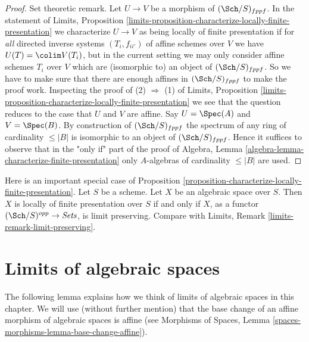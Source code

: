 \begin{proof}
\medskip\noindent
Set theoretic remark. Let $U \to V$ be a morphism of
$(\Sch/S)_{fppf}$. In the statement of
Limits, Proposition
\ref{limits-proposition-characterize-locally-finite-presentation}
we characterize $U \to V$ as being locally of finite presentation
if for {\it all} directed inverse systems $(T_i, f_{ii'})$ of affine schemes
over $V$ we have $U(T) = \colim V(T_i)$, but in the current setting
we may only consider affine schemes $T_i$ over $V$ which are (isomorphic to)
an object of $(\Sch/S)_{fppf}$. So we have to make sure that there
are enough affines in $(\Sch/S)_{fppf}$ to make the proof work.
Inspecting the proof of (2) $\Rightarrow$ (1) of
Limits, Proposition
\ref{limits-proposition-characterize-locally-finite-presentation}
we see that the question reduces to the case that $U$ and $V$ are affine.
Say $U = \Spec(A)$ and $V = \Spec(B)$. By construction
of $(\Sch/S)_{fppf}$ the spectrum of any ring of cardinality
$\leq |B|$ is isomorphic to an object of $(\Sch/S)_{fppf}$.
Hence it suffices to observe that in the "only if" part of the proof of
Algebra, Lemma \ref{algebra-lemma-characterize-finite-presentation}
only $A$-algebras of cardinality $\leq |B|$ are used.
\end{proof}

\begin{remark}
\label{remark-limit-preserving}
Here is an important special case of
Proposition \ref{proposition-characterize-locally-finite-presentation}.
Let $S$ be a scheme. Let $X$ be an algebraic space over $S$.
Then $X$ is locally of finite presentation over $S$ if and only
if $X$, as a functor $(\Sch/S)^{opp} \to \textit{Sets}$,
is limit preserving. Compare with
Limits, Remark \ref{limits-remark-limit-preserving}.
\end{remark}















\section{Limits of algebraic spaces}
\label{section-limits}

\noindent
The following lemma explains how we think of limits of algebraic
spaces in this chapter. We will use (without further mention) that the
base change of an affine morphism of algebraic spaces is affine (see
Morphisms of Spaces, Lemma \ref{spaces-morphisms-lemma-base-change-affine}).

